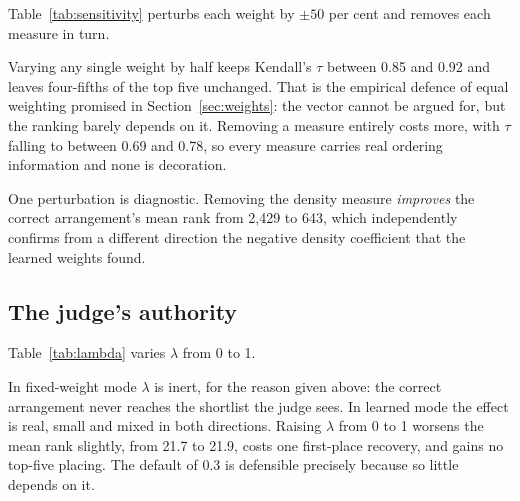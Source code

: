 Table~\ref{tab:sensitivity} perturbs each weight by $\pm 50$ per cent and
removes each measure in turn.

\begin{table}[H]
\centering
\caption[Sensitivity to the score weights]{Sensitivity of the baseline
variant to the score weights, fixed-weight mode. Kendall's $\tau$ compares
the perturbed ranking with the nominal one; top-5 overlap is the
proportion of the nominal top five that survives.}
\label{tab:sensitivity}
\small

\end{table}

Varying any single weight by half keeps Kendall's $\tau$ between 0.85 and
0.92 and leaves four-fifths of the top five unchanged. That is the
empirical defence of equal weighting promised in
Section~\ref{sec:weights}: the vector cannot be argued for, but the
ranking barely depends on it. Removing a measure entirely costs more, with
$\tau$ falling to between 0.69 and 0.78, so every measure carries real
ordering information and none is decoration.

One perturbation is diagnostic. Removing the density measure
\emph{improves} the correct arrangement's mean rank from 2,429 to 643,
which independently confirms from a different direction the negative
density coefficient that the learned weights found.

\subsection{The judge's authority}

Table~\ref{tab:lambda} varies $\lambda$ from 0 to 1.

\begin{table}[H]
\centering
\caption[Sensitivity to the judge's weight]{Sensitivity to $\lambda$, the
weight given to the judge in Equation~\eqref{eq:blend}, for variant V1. At
$\lambda = 0$ every variant reduces to the baseline.}
\label{tab:lambda}
\small

\end{table}

In fixed-weight mode $\lambda$ is inert, for the reason given above: the
correct arrangement never reaches the shortlist the judge sees. In learned
mode the effect is real, small and mixed in both directions. Raising
$\lambda$ from 0 to 1 worsens the mean rank slightly, from 21.7 to 21.9,
costs one first-place recovery, and gains no top-five placing. The default
of 0.3 is defensible precisely because so little depends on it.

